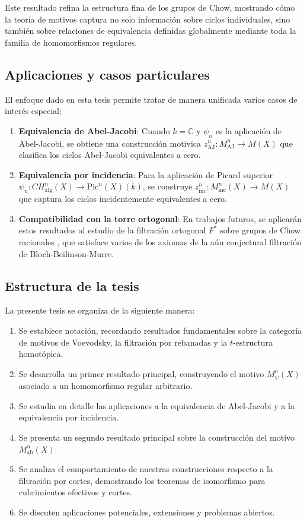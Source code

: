 \documentclass[10pt]{amsart}
\theoremstyle{definition}
\theoremstyle{remark}
\theoremstyle{definition}
\begin{document}
Este resultado refina la estructura fina de los grupos de Chow, mostrando cómo la teoría de motivos captura no solo información sobre ciclos individuales, sino también sobre relaciones de equivalencia definidas globalmente mediante toda la familia de homomorfismos regulares.

\subsection{Aplicaciones y casos particulares}

El enfoque dado en esta tesis permite tratar de manera unificada varios casos de interés especial:

\begin{enumerate}
    \item \textbf{Equivalencia de Abel-Jacobi}: Cuando $k = \mathbb{C}$ y $\psi_n$ es la aplicación de Abel-Jacobi, se obtiene una construcción motivica $z^n_\mathrm{AJ}: M_\mathrm{AJ}^{n} \to M(X)$ que clasifica los ciclos Abel-Jacobi equivalentes a cero.
    \item \textbf{Equivalencia por incidencia}: Para la aplicación de Picard superior $\psi_n: CH^{n}_{\mathrm{alg}}(X) \to \mathrm{Pic}^n(X)(k)$, se construye $z_{\mathrm{inc}}^{n}:M_{\mathrm{inc}}^{n}(X)\to M(X)$ que captura los ciclos incidentemente equivalentes a cero.
    \item \textbf{Compatibilidad con la torre ortogonal}: En trabajos futuros, se aplicarán estos resultados al estudio de la filtración ortogonal $F^*$ sobre grupos de Chow racionales \cite{GP22}, que satisface varios de los axiomas de la aún conjectural filtración de Bloch-Beilinson-Murre.
\end{enumerate}

\subsection{Estructura de la tesis}

La presente tesis se organiza de la siguiente manera:

\begin{enumerate}
    \item Se establece notación, recordando resultados fundamentales sobre la categoría de motivos de Voevodsky, la filtración por rebanadas y la $t$-estructura homotópica.
    \item Se desarrolla un primer resultado principal, construyendo el motivo $M^{n}_{\psi}(X)$ asociado a un homomorfismo regular arbitrario.
    \item Se estudia en detalle las aplicaciones a la equivalencia de Abel-Jacobi y a la equivalencia por incidencia.
    \item  Se presenta un segundo resultado principal sobre la construcción del motivo $M^{n}_{\mathrm{ab}}(X)$.
    \item  Se analiza el comportamiento de nuestras construcciones respecto a la filtración por cortes, demostrando los teoremas de isomorfismo para cubrimientos efectivos y cortes.
    \item  Se discuten aplicaciones potenciales, extensiones y problemas abiertos.
\end{enumerate}
\end{document}
